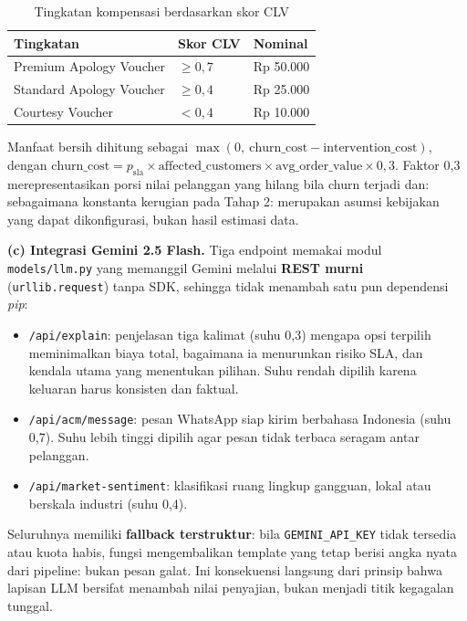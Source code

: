 \documentclass[12pt,a4paper]{article}
\begin{document}
\begin{table}[H]
  \centering\footnotesize
  \caption{Tingkatan kompensasi berdasarkan skor CLV}
  \begin{tabular}{@{}L{5.2cm} L{3.2cm} L{3.0cm}@{}}
    \toprule
    \textbf{Tingkatan} & \textbf{Skor CLV} & \textbf{Nominal} \\
    \midrule
    Premium Apology Voucher  & $\geq 0{,}7$ & Rp 50.000 \\
    Standard Apology Voucher & $\geq 0{,}4$ & Rp 25.000 \\
    Courtesy Voucher         & $< 0{,}4$    & Rp 10.000 \\
    \bottomrule
  \end{tabular}
\end{table}

Manfaat bersih dihitung sebagai $\max(0,\ \text{churn\_cost} - \text{intervention\_cost})$, dengan $\text{churn\_cost} = p_{\text{sla}} \times \text{affected\_customers} \times \text{avg\_order\_value} \times 0{,}3$. Faktor 0,3 merepresentasikan porsi nilai pelanggan yang hilang bila churn terjadi dan: sebagaimana konstanta kerugian pada Tahap 2: merupakan asumsi kebijakan yang dapat dikonfigurasi, bukan hasil estimasi data.

\textbf{(c) Integrasi Gemini 2.5 Flash.} Tiga endpoint memakai modul \texttt{models/llm.py} yang memanggil Gemini melalui \textbf{REST murni} (\texttt{urllib.request}) tanpa SDK, sehingga tidak menambah satu pun dependensi \textit{pip}:

\begin{itemize}
  \item \texttt{/api/explain}: penjelasan tiga kalimat (suhu 0,3) mengapa opsi terpilih meminimalkan biaya total, bagaimana ia menurunkan risiko SLA, dan kendala utama yang menentukan pilihan. Suhu rendah dipilih karena keluaran harus konsisten dan faktual.
  \item \texttt{/api/acm/message}: pesan WhatsApp siap kirim berbahasa Indonesia (suhu 0,7). Suhu lebih tinggi dipilih agar pesan tidak terbaca seragam antar pelanggan.
  \item \texttt{/api/market-sentiment}: klasifikasi ruang lingkup gangguan, lokal atau berskala industri (suhu 0,4).
\end{itemize}

Seluruhnya memiliki \textbf{fallback terstruktur}: bila \texttt{GEMINI\_API\_KEY} tidak tersedia atau kuota habis, fungsi mengembalikan template yang tetap berisi angka nyata dari pipeline: bukan pesan galat. Ini konsekuensi langsung dari prinsip bahwa lapisan LLM bersifat menambah nilai penyajian, bukan menjadi titik kegagalan tunggal.
\end{document}
